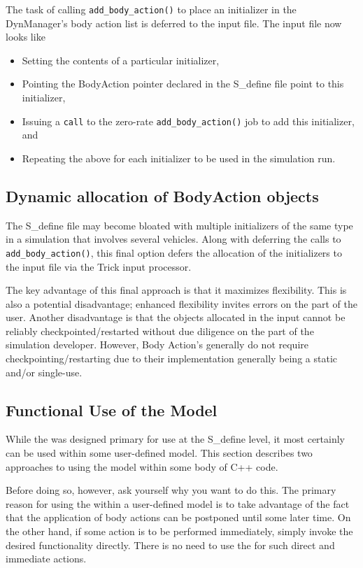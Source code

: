 The task of calling {\tt add\_body\_action()} to place an initializer
in the DynManager's body action list is deferred to the input file.
The input file now looks like
\begin{itemize}
\item Setting the contents of a particular initializer,
\item Pointing the BodyAction pointer declared in
the S\_define file point to this initializer,
\item Issuing a {\tt call} to the zero-rate
{\tt add\_body\_action()} job to add this initializer, and
\item Repeating the above for each initializer to be used in
the simulation run.
\end{itemize}

\subsection{Dynamic allocation of BodyAction objects}
\label{subsec:body_action_pool_practice}
The S\_define file may become bloated with multiple initializers of the
same type in a simulation that involves several vehicles.
Along with deferring the calls to {\tt add\_body\_action()},
this final option defers the allocation of the initializers
to the input file via the Trick input processor.

The key advantage of this final approach is that it maximizes flexibility.
This is also a potential disadvantage; enhanced flexibility invites errors
on the part of the user. Another disadvantage is that the objects allocated in the
input cannot be reliably checkpointed/restarted without due diligence on the part of the
simulation developer. However, Body Action's generally do not require checkpointing/restarting due to their implementation generally being a static and/or single-use.


\subsection{Functional Use of the Model}
While the \ModelDesc was designed primary for use at the S\_define level,
it most certainly can be used within some user-defined model.
This section describes two approaches to using the model within
some body of C++ code.

Before doing so, however, ask yourself why you want to do this.
The primary reason for using the \ModelDesc within a user-defined model
is to take advantage of the fact that the application of body actions can be
postponed until some later time. On the other hand, if some action is to be
performed immediately, simply invoke the desired functionality directly.
There is no need to use the \ModelDesc for such direct and immediate actions.

